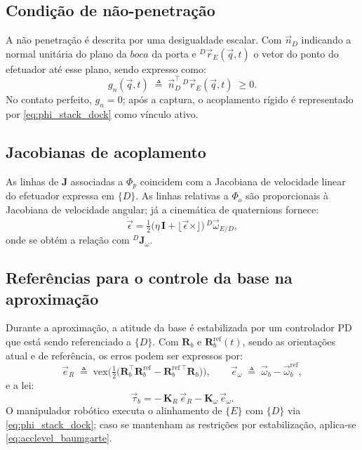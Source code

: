 \subsection{Condição de não-penetração}
A não penetração é descrita por uma desigualdade escalar.
Com $\vec n_{D}$ indicando a normal unitária do plano da $boca$ da porta e
${}^{D}\!\vec r_{E}(\vec q,t)$
o vetor do ponto do efetuador até esse plano, sendo expresso como:
\begin{equation}
g_{n}(\vec q,t)\;
\triangleq\;
\vec n_{D}^{\top}\,{}^{D}\!\vec r_{E}(\vec q,t)\;\ge 0.
\label{eq:gap}
\end{equation}
No contato perfeito, $g_{n}=0$;
após a captura, o acoplamento rígido é representado por
\eqref{eq:phi_stack_dock} como vínculo ativo.

\subsection{Jacobianas de acoplamento}
As linhas de $\mathbf J$ associadas a $\Phi_{p}$
coincidem com a Jacobiana de velocidade linear do efetuador expressa em $\{D\}$. 
As linhas relativas a $\Phi_{o}$ são proporcionais à Jacobiana de velocidade angular;
já a cinemática de quaternions fornece:
\begin{equation}
\dot{\vec\epsilon}
=
\tfrac12\big
(\eta\,\mathbf I+\lfloor\vec\epsilon\times\rfloor\big)\,
{}^{D}\!\vec\omega_{E/D},
\end{equation}
onde se obtém a relação com ${}^{D}\!\mathbf J_{\omega}$.

\subsection{Referências para o controle da base na aproximação}
Durante a aproximação, a atitude da base é estabilizada por um controlador PD que está sendo referenciado a $\{D\}$.
Com $\mathbf R_{b}$ e $\mathbf R_{b}^{\mathrm{ref}}(t)$,
sendo as orientações atual e de referência, os erros podem ser expressos por:
\begin{equation}
\vec e_{R}\;
\triangleq\;
\mathrm{vex}\!\Big
(\tfrac12\big(\mathbf R_{b}^{\top}\mathbf R_{b}^{\mathrm{ref}}-\mathbf R_{b}^{\mathrm{ref}\,\top}\mathbf R_{b}\big)\Big),
\qquad
\vec e_{\omega}\;
\triangleq\;
\vec\omega_{b}
-\vec\omega_{b}^{\mathrm{ref}},
\label{eq:err_base}
\end{equation}
e a lei:
\begin{equation}
\vec\tau_{b}
=
-\,\mathbf K_{R}\,\vec e_{R}
-\mathbf K_{\omega}\,\vec e_{\omega}.
\label{eq:pd_base}
\end{equation}
O manipulador robótico executa o alinhamento de $\{E\}$ com $\{D\}$ via \eqref{eq:phi_stack_dock};
caso se mantenham as restrições por estabilização, aplica-se \eqref{eq:acclevel_baumgarte}.

